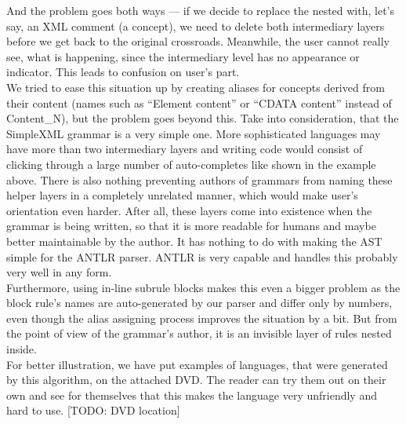 And the problem goes both ways --- if we decide to replace the nested  with, let's say, an XML comment (a  concept), we need to delete both intermediary layers before we get back to the original  crossroads.
Meanwhile, the user cannot really see, what is happening, since the intermediary level has no appearance or indicator.
This leads to confusion on user's part.
\\

We tried to ease this situation up by creating aliases for concepts derived from their content (names such as “Element content” or “CDATA content” instead of Content{\_}N), but the problem goes beyond this.
Take into consideration, that the SimpleXML grammar is a very simple one.
More sophisticated languages may have more than two intermediary layers and writing code would consist of clicking through a large number of auto-completes like shown in the example above.
There is also nothing preventing authors of grammars from naming these helper layers in a completely unrelated manner, which would make user's orientation even harder.
After all, these layers come into existence when the grammar is being written, so that it is more readable for humans and maybe better maintainable by the author.
It has nothing to do with making the AST simple for the ANTLR parser.
ANTLR is very capable and handles this probably very well in any form.
\\

Furthermore, using in-line subrule blocks makes this even a bigger problem as the block rule's names are auto-generated by our parser and differ only by numbers, even though the alias assigning process improves the situation by a bit.
But from the point of view of the grammar's author, it is an invisible layer of rules nested inside.
\\

For better illustration, we have put examples of languages, that were generated by this algorithm, on the attached DVD. The reader can try them out on their own and see for themselves that this makes the language very unfriendly and hard to use. [TODO: DVD location]
